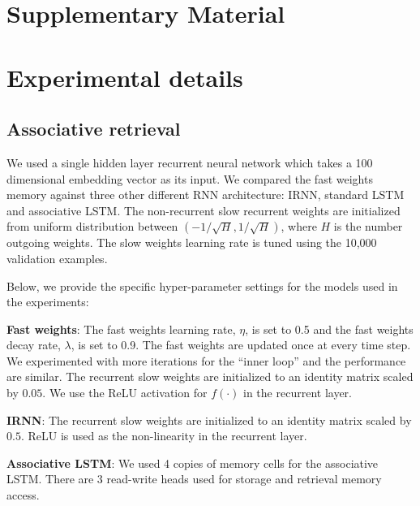 \documentclass{article}
\begin{document}
\begin{footnotesize}
  \setlength{\bibsep}{5pt plus 2.0ex}

\end{footnotesize}

\appendix
{}
\section*{Supplementary Material}

\section{Experimental details}
\subsection{Associative retrieval}

We used a single hidden layer recurrent neural network which takes a 100 dimensional embedding vector as its input. We compared the fast weights memory against three other different RNN architecture: IRNN, standard LSTM and associative LSTM. The non-recurrent slow recurrent weights are initialized from uniform distribution between $(-1/\sqrt{H}, 1/\sqrt{H})$, where $H$ is the number outgoing weights. The slow weights learning rate is tuned using the 10,000 validation examples. 

\vspace{0.1in}

Below, we provide the specific hyper-parameter settings for the models used in the experiments:

\textbf{Fast weights}: The fast weights learning rate, $\eta$, is set to 0.5 and the fast weights decay rate, $\lambda$, is set to 0.9. The fast weights are updated once at every time step. We experimented with more iterations for the ``inner loop'' and the performance are similar. The recurrent slow weights are initialized to an identity matrix scaled by $0.05$. We use the ReLU activation for $f(\cdot)$ in the recurrent layer.

\vspace{0.1in}

\textbf{IRNN}: The recurrent slow weights are initialized to an identity matrix scaled by $0.5$. ReLU is used as the non-linearity in the recurrent layer.

\vspace{0.1in}

\textbf{Associative LSTM}: We used 4 copies of memory cells for the associative LSTM. There are 3 read-write heads used for storage and retrieval memory access. 
\end{document}
